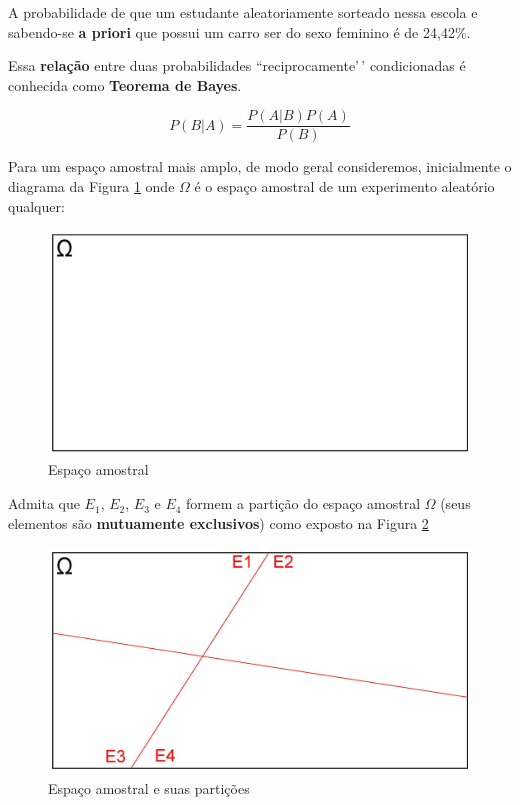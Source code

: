 \documentclass[
]{book}
\begin{document}
\hfill\break

A probabilidade de que um estudante aleatoriamente sorteado nessa escola e sabendo-se \textbf{a priori} que possui um carro ser do sexo feminino é de 24,42\%.

\hfill\break

Essa \textbf{relação} entre duas probabilidades ``reciprocamente'\,' condicionadas é conhecida como \textbf{Teorema de Bayes}.

\hfill\break

\[
P(B|A) = \frac{P(A|B) P(A)}{P(B)}
\]

\hfill\break

Para um espaço amostral mais amplo, de modo geral consideremos, inicialmente o diagrama da Figura \ref{fig:fig6} onde \(\Omega\) é o espaço amostral de um experimento aleatório qualquer:

\hfill\break

\begin{figure}

{\centering \includegraphics[width=0.8\linewidth]{images4/bayes_1} 

}

\caption{Espaço amostral}\label{fig:fig6}
\end{figure}

\hfill\break

Admita que \(E_{1}\), \(E_{2}\), \(E_{3}\) e \(E_{4}\) formem a partição do espaço amostral \(\Omega\) (seus elementos são \textbf{mutuamente exclusivos}) como exposto na Figura \ref{fig:fig7}

\hfill\break

\begin{figure}

{\centering \includegraphics[width=0.8\linewidth]{images4/bayes_2} 

}

\caption{Espaço amostral e suas partições}\label{fig:fig7}
\end{figure}
\end{document}

